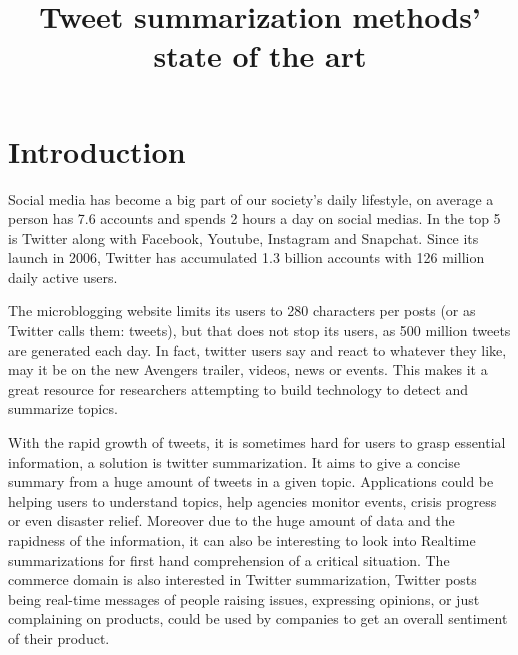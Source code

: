 \documentclass{llncs}
\begin{document}
\title{Tweet summarization methods' state of the art}



\maketitle

\section{Introduction}

Social media has become a big part of our society's daily lifestyle, on average
a person has 7.6 accounts and spends 2 hours a day on social medias. In the top
5 is Twitter along with Facebook, Youtube, Instagram and Snapchat. Since its
launch in 2006, Twitter has accumulated 1.3 billion accounts with 126 million
daily active users.

The microblogging website limits its users to 280 characters per posts (or as
Twitter calls them: tweets), but that does not stop its users, as 500 million
tweets are generated each day. In fact, twitter users say and react to whatever
they like, may it be on the new Avengers trailer, videos, news or events. This
makes it a great resource for researchers attempting to build technology to
detect and summarize topics.

With the rapid growth of tweets, it is sometimes hard for users to grasp
essential information, a solution is twitter summarization. It aims to give a
concise summary from a huge amount of tweets in a given topic. Applications
could be helping users to understand topics, help agencies monitor events,
crisis progress or even disaster relief. Moreover due to the huge amount of
data and the rapidness of the information, it can also be interesting to look
into Realtime summarizations for first hand comprehension of a critical
situation.  The commerce domain is also interested in Twitter summarization,
Twitter posts being real-time messages of people raising issues, expressing
opinions, or just complaining on products, could be used by companies to get an
overall sentiment of their product.
\end{document}
